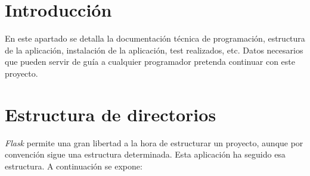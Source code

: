 
\section{Introducción}
En este apartado se detalla la documentación técnica de programación, estructura de la aplicación, instalación de la aplicación, test realizados, etc. Datos necesarios que pueden servir de guía a cualquier programador pretenda continuar con este proyecto.

\section{Estructura de directorios}

\emph{Flask} permite una gran libertad a la hora de estructurar un proyecto, aunque por convención sigue una estructura determinada. Esta aplicación ha seguido esa estructura. A continuación se expone:

